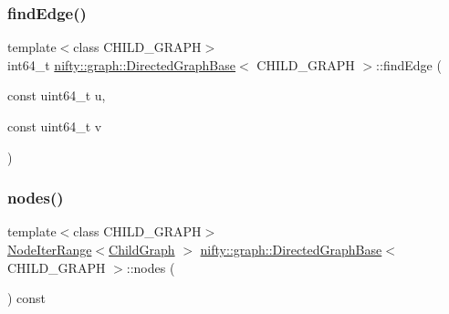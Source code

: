\subsubsection{\texorpdfstring{find\+Edge()}{findEdge()}}
{\footnotesize\ttfamily template$<$class C\+H\+I\+L\+D\+\_\+\+G\+R\+A\+PH$>$ \\
int64\+\_\+t \hyperlink{classnifty_1_1graph_1_1DirectedGraphBase}{nifty\+::graph\+::\+Directed\+Graph\+Base}$<$ C\+H\+I\+L\+D\+\_\+\+G\+R\+A\+PH $>$\+::find\+Edge (\begin{DoxyParamCaption}\item[{const uint64\+\_\+t}]{u,  }\item[{const uint64\+\_\+t}]{v }\end{DoxyParamCaption})\hspace{0.3cm}{\ttfamily [inline]}}

\mbox{\label{classnifty_1_1graph_1_1DirectedGraphBase_a6fcfc4a5a92e022bea68c52127913e5d}} 
\subsubsection{\texorpdfstring{nodes()}{nodes()}}
{\footnotesize\ttfamily template$<$class C\+H\+I\+L\+D\+\_\+\+G\+R\+A\+PH$>$ \\
\hyperlink{structnifty_1_1graph_1_1DirectedGraphBase_1_1NodeIterRange}{Node\+Iter\+Range}$<$\hyperlink{classnifty_1_1graph_1_1DirectedGraphBase_a583e01641aec296b9bc33a346f90a216}{Child\+Graph} $>$ \hyperlink{classnifty_1_1graph_1_1DirectedGraphBase}{nifty\+::graph\+::\+Directed\+Graph\+Base}$<$ C\+H\+I\+L\+D\+\_\+\+G\+R\+A\+PH $>$\+::nodes (\begin{DoxyParamCaption}{ }\end{DoxyParamCaption}) const\hspace{0.3cm}{\ttfamily [inline]}}

\mbox{\label{classnifty_1_1graph_1_1DirectedGraphBase_a6dde14aadeb86c8fba6f827bde9fbff5}} 
